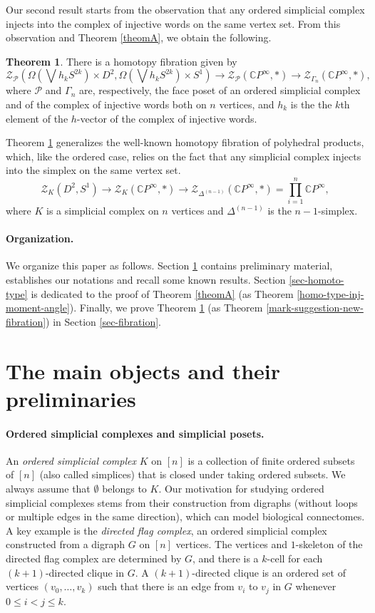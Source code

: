 \documentclass[a4paper,11pt]{article}
\theoremstyle{definition}
\newtheorem{alphabeticaltheorem}{Theorem}[theorem] %
\newcommand{\C}{\mathbb{C}}
\newcommand{\PP}{\mathcal{P}}
\newcommand{\ZZ}{\mathcal{Z}}
\begin{document}
Our second result starts from the observation that any ordered simplicial complex injects into the
complex of injective words on the same vertex set. From this observation and Theorem \ref{theomA}, we obtain the following. 

\begin{alphabeticaltheorem}\label{theomB}
There is a homotopy fibration given by 
\[
\ZZ_\PP(\Omega(\bigvee h_k S^{2k})\times D^2, \Omega(\bigvee h_k S^{2k})\times S^1 )	\to \ZZ_\PP(\C P^\infty,*)\to \ZZ_{\Gamma_n}(\C P^\infty,*),
\]
where $\PP$ and $\Gamma_n$ are, respectively, the face poset of an ordered simplicial complex and of the complex of injective words both on $n$ vertices, and $h_k$ is the the $k$th element of the $h$-vector of the complex of injective words.
\end{alphabeticaltheorem}

Theorem \ref{theomB} generalizes the well-known homotopy fibration of polyhedral products, which, like the ordered case, relies on the fact that any simplicial complex injects into the simplex on the same vertex set.
\[
\ZZ_{K}(D^2,S^1) \to \ZZ_K(\C P^\infty, *) \to \ZZ_{\Delta^{(n-1)}}(\C P^\infty, *) = \prod_{i = 1} ^n\C P^\infty,
\]
where $K$ is a simplicial complex on $n$ vertices and $\Delta^{(n-1)}$ is the $n-1$-simplex.

\paragraph{Organization.} We organize this paper as follows. Section \ref{sec-preliminaries} contains  preliminary material, establishes our notations and recall some known results. Section \ref{sec-homoto-type} is dedicated to the proof of Theorem \ref{theomA} (as Theorem \ref{homo-type-inj-moment-angle}). Finally, we prove Theorem \ref{theomB} (as Theorem \ref{mark-suggestion-new-fibration}) in Section \ref{sec-fibration}.

\section{The main objects and their preliminaries}\label{sec-preliminaries}

\paragraph{Ordered simplicial complexes and simplicial posets.} An \emph{ordered simplicial complex} $K$ on $[n]$ is a collection of finite ordered subsets of $[n]$ (also called simplices) that is closed under taking ordered subsets. We always assume that $\emptyset$ belongs to $K$. Our motivation for studying ordered simplicial complexes stems from their construction from digraphs (without loops or multiple edges in the same direction), which can model biological connectomes. A key example is the \emph{directed flag complex}, an ordered simplicial complex constructed from a digraph 
$G$ on $[n]$ vertices. The vertices and {$1$-skeleton} of the directed flag complex are determined by $G$, and there is a $k$-cell for each $(k+1)$-directed clique in $G$. A $(k+1)$-directed clique  is an ordered set of vertices $(v_0, \ldots, v_k)$ such that there is an edge from $v_i$ to $v_j$ in $G$ whenever $0 \leq i < j \leq k$. 
\end{document}
